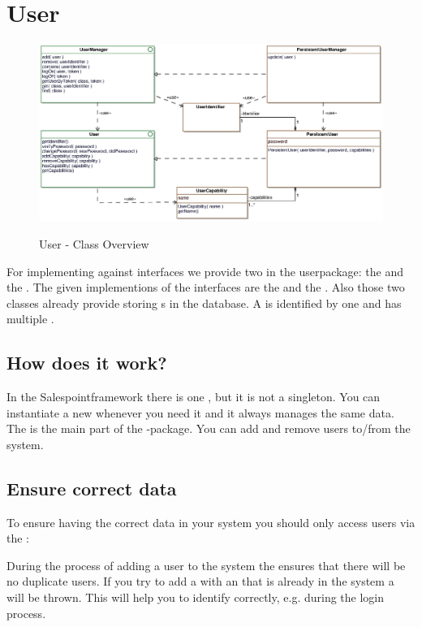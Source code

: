 \newpage
\section{User}


\begin{figure}[ht]
	\centering
  \includegraphics[width=1.0\textwidth]{images/User_Overview.eps}
	\label{user_overview}
	\caption{User - Class Overview}
\end{figure}

For implementing against interfaces we provide two in the userpackage: the  and the . The given implementions of the interfaces 
are the  and the . Also those two classes already provide storing s in the database.
A  is identified by one  and has multiple .


\subsection{How does it work?}

In the Salespointframework there is one , but it is not a singleton. You can instantiate a new  whenever you need it and it always manages the same data.
The  is the main part of the -package.
You can add and remove users to/from the system.


\subsection{Ensure correct data}
To ensure having the correct data in your system you should only access users via the :

During the process of adding a user to the system the  ensures that there will be no duplicate users. If you try to add a  with an  that is already in the system a  will be thrown. This will help you to identify  correctly, e.g. during the login process.

